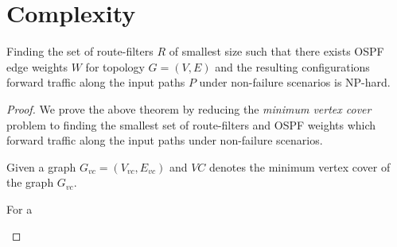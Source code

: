 \section{Complexity}
\begin{theorem}
Finding the set of route-filters $R$ of smallest size such
 that there exists OSPF edge weights $W$ for topology $G=(V,E)$ 
 and the resulting configurations forward traffic along the
input paths $P$ under non-failure scenarios is NP-hard.
\end{theorem}

\begin{proof}
We prove the above theorem by reducing the \emph{minimum vertex cover} problem
to finding the smallest set of route-filters and OSPF weights 
which forward traffic along the
input paths under non-failure scenarios. 

Given a graph $G_{vc}=(V_{vc},E_{vc})$ and $VC$ denotes the minimum 
vertex cover of the graph $G_{vc}$. 

\begin{lemma}
	For a 
\end{lemma}
\end{proof}